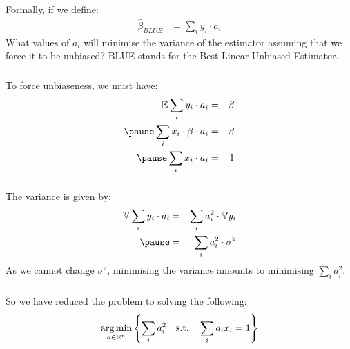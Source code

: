 \begin{frame}[fragile] \frametitle{}

Formally, if we define:
\begin{align*}
\widehat{\beta}_{BLUE} &= \sum_i y_i \cdot a_i
\end{align*}
What values of $a_i$ will minimise the variance of the
estimator assuming that we force it to be unbiased? BLUE
stands for the Best Linear Unbiased Estimator.

\end{frame}

\begin{frame}[fragile] \frametitle{}

To force unbiaseness, we must have:
\begin{eqnarray*}
\mathbb{E} \sum_i y_i \cdot a_i &=& \beta \\ \pause
\sum_i x_i \cdot \beta \cdot a_i &=& \beta \\ \pause
\sum_i x_i \cdot a_i &=& 1 \\
\end{eqnarray*}

\end{frame}

\begin{frame}[fragile] \frametitle{}

The variance is given by:
\begin{eqnarray*}
\mathbb{V} \sum_i y_i \cdot a_i &=& \sum_i a_i^2 \cdot \mathbb{V} y_i \\ \pause
&=& \sum_i a_i^2 \cdot \sigma^2
\end{eqnarray*}
As we cannot change $\sigma^2$, minimising the variance
amounts to minimising $\sum_i a_i^2$.

\end{frame}

\begin{frame}[fragile] \frametitle{}

So we have reduced the problem to solving the following:
\begin{align*}
\mathop{\mathrm{arg\,min}}_{a \in \mathbb{R}^n} \left\{ \sum_i a_i^2 \quad \text{s.t.} \quad \sum_i a_i x_i = 1 \right\}
\end{align*}

\end{frame}

